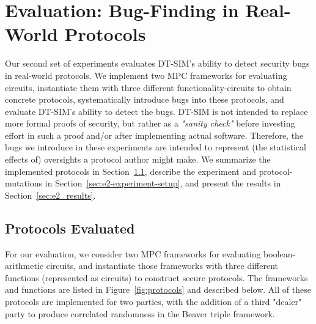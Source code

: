 \documentclass[acmlarge, manuscript, screen, review, anonymous, table]{acmart}
\newcommand{\toolname}{\textsc{DT-SIM}\xspace}
\begin{document}
\section{Evaluation: Bug-Finding in Real-World Protocols}
\label{sec:case-study-protocols}

Our second set of experiments evaluates \toolname's ability to detect security bugs in real-world protocols.
We implement two MPC frameworks for evaluating circuits,
instantiate them with three different functionality-circuits to obtain concrete protocols,
systematically introduce bugs into these protocols,
and evaluate \toolname's ability to detect the bugs.
\toolname is not intended to replace more formal proofs of security,
but rather as a \emph{"sanity check"} before investing effort in such a proof and/or after implementing actual software.
Therefore, the bugs we introduce in these experiments are intended to represent (the statistical effects of) oversights a protocol author might make.
We summarize the implemented protocols in Section~\ref{sec:protocols-evaluated},
describe the experiment and protocol-mutations in Section~\ref{sec:e2-experiment-setup},
and present the results in Section~\ref{sec:e2_results}.

\subsection{Protocols Evaluated}
\label{sec:protocols-evaluated}

For our evaluation, we consider two MPC frameworks for evaluating boolean-arithmetic circuits,
and instantiate those frameworks with three different functions (represented as circuits) to construct secure protocols.
The frameworks and functions are listed in Figure~\ref{fig:protocols} and described below.
All of these protocols are implemented for two parties,
with the addition of a third "dealer" party to produce correlated randomness in the Beaver triple framework.
\end{document}
